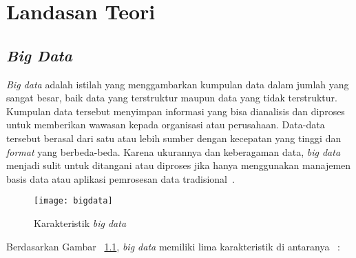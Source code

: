 \chapter{Landasan Teori}
\label{chap:teori}

\section{\textit{Big Data}}
\label{sec:big data}

\textit{Big data} adalah istilah yang menggambarkan kumpulan data dalam jumlah yang sangat besar, baik data yang terstruktur maupun data yang tidak terstruktur. Kumpulan data tersebut menyimpan informasi yang bisa dianalisis dan diproses untuk memberikan wawasan kepada organisasi atau perusahaan. Data-data tersebut berasal dari satu atau lebih sumber  dengan kecepatan yang tinggi dan \textit{format} yang berbeda-beda. Karena ukurannya dan keberagaman data, \textit{big data} menjadi sulit untuk ditangani atau diproses jika hanya menggunakan manajemen basis data atau aplikasi pemrosesan data tradisional~\cite{ishwarappa:01:bgintro}.\\


\begin{figure}[H]
    \centering  
    \texttt{[image: bigdata]}  
    \caption[Karakteristik \textit{big data} ]{Karakteristik \textit{big data}} 
    \label{fig:bigdata} 
\end{figure}

Berdasarkan Gambar ~\ref{fig:bigdata}, \textit{big data} memiliki lima karakteristik di antaranya ~\cite{ishwarappa:01:bgintro}:

